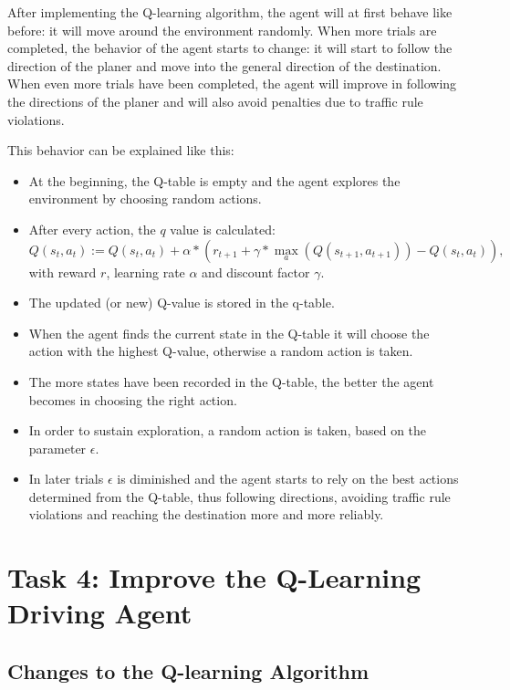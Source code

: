 \documentclass[11pt]{article}
\begin{document}
After implementing the Q-learning algorithm, the agent will at first behave like before: it will move around the environment randomly. When more trials are completed, the behavior of the agent starts to change: it will start to follow the direction of the planer and move into the general direction of the destination. When even more trials have been completed, the agent will improve in following the directions of the planer and will also avoid penalties due to traffic rule violations.

This behavior can be explained like this:
\begin{itemize}
    \item At the beginning, the Q-table is empty and the agent explores the environment by choosing random actions.
    \item After every action, the $q$ value is calculated:
      \begin{equation}
          Q(s_t,a_t) :=  Q(s_t,a_t) + \alpha * (r_{t+1} + \gamma * \max\limits_a(Q(s_{t+1},a_{t+1})) - Q(s_t,a_t)),
      \end{equation} 
      with reward $r$, learning rate $\alpha$ and discount factor $\gamma$.
    \item The updated (or new) Q-value is stored in the q-table.
    \item When the agent finds the current state in the Q-table it will choose the action with the highest Q-value, otherwise a random action is taken.
    \item The more states have been recorded in the Q-table, the better the agent becomes in choosing the right action.
    \item In order to sustain exploration, a random action is taken, based on the parameter $\epsilon$.
    \item In later trials $\epsilon$ is diminished and the agent starts to rely on the best actions determined from the Q-table, thus following directions, avoiding 
    traffic rule violations and reaching the destination more and more reliably.
\end{itemize}

\section*{Task 4: Improve the Q-Learning Driving Agent}
\setcounter{section}{4} 
\subsection{Changes to the Q-learning Algorithm}
\end{document}
